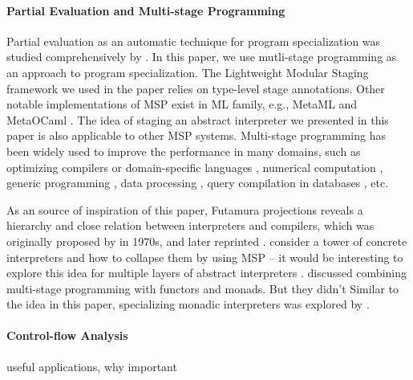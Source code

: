 \paragraph{Partial Evaluation and Multi-stage Programming}
Partial evaluation as an automatic technique for program
specialization was studied comprehensively by
\citet{10.1007/3-540-61580-6_11, DBLP:books/daglib/0072559}.  In this
paper, we use mutli-stage programming as an approach to program
specialization. The Lightweight Modular Staging framework
\cite{DBLP:conf/gpce/RompfO10} we used in the paper relies on
type-level stage annotations.  Other notable implementations of MSP
exist in ML family, e.g., MetaML \cite{DBLP:conf/pepm/TahaS97} and
MetaOCaml \cite{DBLP:conf/gpce/CalcagnoTHL03,
  DBLP:conf/flops/Kiselyov14}.  The idea of staging an abstract
interpreter we presented in this paper is also applicable to other MSP
systems.  Multi-stage programming has been widely used to improve the
performance in many domains, such as optimizing compilers or
domain-specific languages \cite{DBLP:conf/pldi/RompfSBLCO14,
  DBLP:conf/snapl/RompfBLSJAOSKDK15,
  DBLP:journals/tecs/SujeethBLRCOO14, DBLP:conf/gpce/SujeethGBLROO13,
  DBLP:journals/jfp/CaretteKS09}, numerical computation \cite{PGL-038,
  DBLP:conf/pepm/AktemurKKS13}, generic programming
\cite{DBLP:journals/pacmpl/Yallop17,
  Ofenbeck:2017:SGP:3136040.3136060}, data processing
\cite{DBLP:conf/oopsla/JonnalageddaCSRO14,
  DBLP:conf/popl/KiselyovBPS17}, query compilation in databases
\cite{DBLP:conf/osdi/EssertelTDBOR18, DBLP:conf/sigmod/TahboubER18},
etc.

As an source of inspiration of this paper, Futamura projections
reveals a hierarchy and close relation between interpreters and
compilers, which was originally proposed by
\citeauthor{futamura1971partial} in 1970s\cite{futamura1971partial},
and later reprinted \cite{Futamura1999}.
\citeauthor{Amin:2017:CTI:3177123.3158140} consider a tower of
concrete interpreters and how to collapse them by using MSP -- it
would be interesting to explore this idea for multiple layers of
abstract interpreters \cite{Cousot:2019:AAI:3302515.3290355,
  Giacobazzi:2015:APA:2676726.2676987}.  \citet{10.1007/11561347_18}
discussed combining multi-stage programming with functors and
monads. But they didn't   Similar to the idea
in this paper, specializing monadic interpreters was explored by
\citet{DBLP:conf/dsl/SheardBP99, danvy1991compiling}. 

\paragraph{Control-flow Analysis} useful applications, why important
